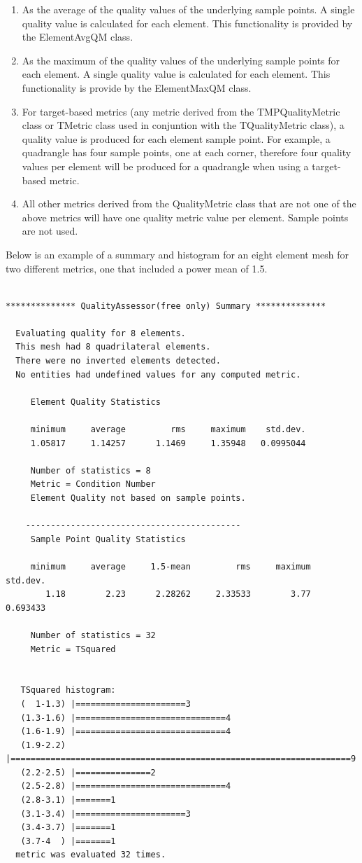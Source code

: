 \begin{enumerate}
\item As the average of the quality values of the underlying sample points.  A single quality value is calculated for each element.  This functionality is provided by the ElementAvgQM class.
\item As the maximum of the quality values of the underlying sample points for each element.  A single quality value is calculated for each element.  This functionality is provide by the ElementMaxQM class.
\item For target-based metrics (any metric derived from the TMPQualityMetric class or TMetric class used in conjuntion with the TQualityMetric class),  a quality value is produced for each element sample point.  For example, a quadrangle has four sample points, one at each corner, therefore four quality values per element will be produced for a quadrangle when using a target-based metric. 
\item All other metrics derived from the QualityMetric class that are not one of the above metrics will have one quality metric value per element.  Sample points are not used.
\end{enumerate}


  Below is an example of a summary and histogram for an eight element mesh for two different metrics, one that included a power mean of 1.5.


\begin{verbatim}

************** QualityAssessor(free only) Summary **************

  Evaluating quality for 8 elements.
  This mesh had 8 quadrilateral elements.
  There were no inverted elements detected.
  No entities had undefined values for any computed metric.

     Element Quality Statistics

     minimum     average         rms     maximum    std.dev.
     1.05817     1.14257      1.1469     1.35948   0.0995044

     Number of statistics = 8
     Metric = Condition Number
     Element Quality not based on sample points.

    -------------------------------------------
     Sample Point Quality Statistics

     minimum     average     1.5-mean         rms     maximum    std.dev.
        1.18        2.23      2.28262     2.33533        3.77    0.693433

     Number of statistics = 32
     Metric = TSquared 


   TSquared histogram:
   (  1-1.3) |======================3
   (1.3-1.6) |==============================4
   (1.6-1.9) |==============================4
   (1.9-2.2) |====================================================================9
   (2.2-2.5) |===============2
   (2.5-2.8) |==============================4
   (2.8-3.1) |=======1
   (3.1-3.4) |======================3
   (3.4-3.7) |=======1
   (3.7-4  ) |=======1
  metric was evaluated 32 times.

\end{verbatim}

